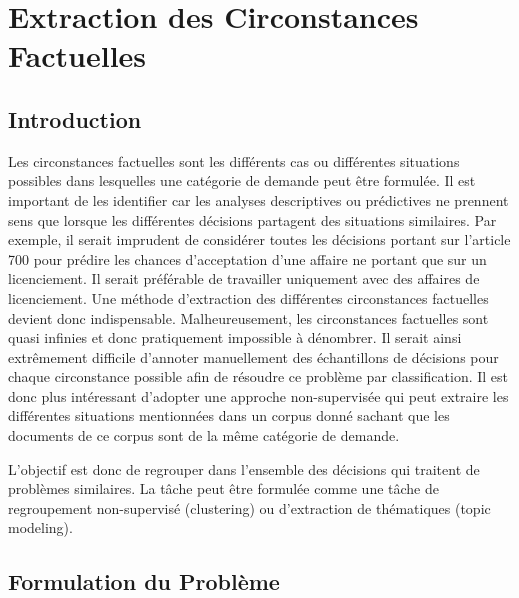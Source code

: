  \chapter{Extraction des Circonstances Factuelles}
\label{chap:similarite}

% 

\section{Introduction}
\label{sec:similarite:introduction}
Les circonstances factuelles sont les différents cas ou différentes situations possibles dans lesquelles une catégorie de demande peut être formulée. Il est important de les identifier car les analyses descriptives ou prédictives ne prennent sens que lorsque les différentes décisions partagent des situations similaires. Par exemple, il serait imprudent de considérer toutes les décisions portant sur l'article 700 pour prédire les chances d'acceptation d'une affaire ne portant que sur un licenciement. Il serait préférable de travailler uniquement avec des affaires de licenciement. Une méthode d'extraction des différentes circonstances factuelles devient donc indispensable. Malheureusement, les circonstances factuelles sont quasi infinies et donc pratiquement impossible à dénombrer. Il serait ainsi extrêmement difficile d'annoter manuellement des échantillons de décisions pour chaque circonstance possible afin de résoudre ce problème par classification. Il est donc plus intéressant d'adopter une approche non-supervisée qui peut extraire les différentes situations mentionnées dans un corpus donné sachant que les documents de ce corpus sont de la même catégorie de demande.

L’objectif est donc de regrouper dans l’ensemble des décisions qui traitent de problèmes similaires. La tâche peut être formulée comme une tâche de regroupement non-supervisé (clustering) ou d’extraction de thématiques (topic modeling). 
\section{Formulation du Problème}
\label{sec:similarite:probleme}



